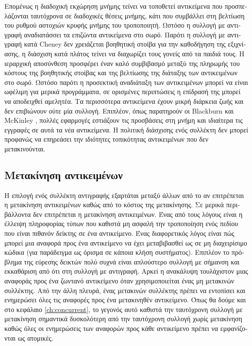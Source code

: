 \begin{greek}
Επομένως η διαδοχική εκχώρηση μνήμης τείνει να τοποθετεί αντικείμενα
που προσπελάζονται ταυτόχρονα σε διαδοχικές θέσεις μνήμης, κάτι
που συμβάλλει στη βελτίωση του ρυθμού αστοχιών κρυφής μνήμης
του τροποποιητή. Ωστόσο η συλλογή με αντιγραφή αναδιατάσσει
τα επιζώντα αντικείμενα στο σωρό. Παρότι η συλλογή με αντιγραφή
κατά Cheney δεν χρειάζεται βοηθητική στοίβα για την καθοδήγηση
της εξιχνίασης, η διάσχιση κατά πλάτος τείνει να διαχωρίζει τους
γονείς από τα παιδιά τους. Η ιεραρχική αποσύνθεση προσφέρει
έναν καλό συμβιβασμό μεταξύ της πληρωμής του κόστους της βοηθητικής 
στοίβας και της βελτίωσης της διάταξης των αντικειμένων στο σωρό.
Ωστόσο παρότι η προσεκτική αναδιάταξη των αντικειμένων μπορεί
να είναι ωφέλιμη για μερικά προγράμματα, σε ορισμένες περιπτώσεις
η επίδρασή της μπορεί να αποδειχθεί αμελητέα. Τα περισσότερα
αντικείμενα έχουν μικρή διάρκεια ζωής και δεν επιβιώνουν ούτε
μία συλλογή. Επιπλέον, όπως παρατηρούν οι Blackburn και McKinley
\cite{DBLP:conf/oopsla/BlackburnM03}, πολλές εφαρμογές εστιάζουν τις προσβάσεις στη μνήμη και
ιδιαίτερα τις εγγραφές σε αυτά τα νέα αντικείμενα. Η πολιτική
διάσχισης ενός συλλέκτη δεν μπορεί προφανώς να επηρεάσει την
ιδιότητες τοπικότητας αντικειμένων που δεν μετακινούνται.

\subsection{Μετακίνηση αντικειμένων}
Η επιλογή ενός συλλέκτη αντιγραφής εξαρτάται μεταξύ άλλων από το
αν επιτρέπεται η μετακίνηση αντικειμένων καθώς από το κόστος της
μετακίνησης. Σε μερικά περιβάλλοντα δεν επιτρέπεται η μετακίνηση
αντικειμένων. Ένας από τους λόγους είναι η έλλειψη πληροφορίας
τύπων που καθιστά μη ασφαλή την τροποποίηση ενός πεδίου που είναι
πιθανόν δείκτης σε ένα αντικείμενο. Ένας διαφορετικός λόγος είναι
πώς μπορεί μια αναφορά προς ένα αντικείμενο να έχει μεταβιβασθεί 
ως σε μη διαχειρίσιμο κώδικα (για παράδειγμα ως όρισμα σε κάποια
κλήση συστήματος). Επιπλέον το πρόβλημα της εύρεσης δεικτών πολύ
συχνά είναι απλούστερο συλλογή με σήμανση και εκκαθάριση από ότι
στη συλλογή με αντιγραφή. Αρκεί η ανακάλυψη τουλάχιστον μιας
αναφοράς προς ένα ζωντανό αντικείμενο όταν χρησιμοποιείται ένας
μη μετακινών συλλέκτης. Από την άλλη πλευρά, ένας μετακινών
συλλέκτης πρέπει να εντοπίσει και ενημερώσει όλες τις αναφορές
προς ένα μετακινηθέν αντικείμενο. Όπως θα δούμε και στο κεφάλαιο
\ref{ch:concurrent}, το γεγονός αυτό καθιστά την ταυτόχρονη συλλογή
με μετακίνηση σημαντικά δυσκολότερη από την ταυτόχρονη συλλογή 
χωρίς μετακίνηση καθώς όλες οι ενημερώσεις των αναφορών προς
κάθε αντικείμενο πρέπει να εμφανίζονται ως ατομικές.


\end{greek}
